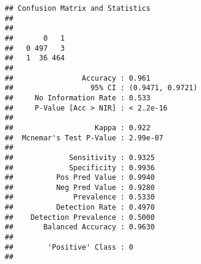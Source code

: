 \documentclass[]{article}
\newenvironment{Shaded}{\begin{snugshade}}{\end{snugshade}}
\newcommand{\KeywordTok}[1]{\textcolor[rgb]{0.13,0.29,0.53}{\textbf{#1}}}
\newcommand{\DataTypeTok}[1]{\textcolor[rgb]{0.13,0.29,0.53}{#1}}
\newcommand{\DecValTok}[1]{\textcolor[rgb]{0.00,0.00,0.81}{#1}}
\newcommand{\FloatTok}[1]{\textcolor[rgb]{0.00,0.00,0.81}{#1}}
\newcommand{\StringTok}[1]{\textcolor[rgb]{0.31,0.60,0.02}{#1}}
\newcommand{\OperatorTok}[1]{\textcolor[rgb]{0.81,0.36,0.00}{\textbf{#1}}}
\newcommand{\NormalTok}[1]{#1}
\begin{document}
\begin{Shaded}
\end{Shaded}

\begin{verbatim}
## Confusion Matrix and Statistics
## 
##    
##       0   1
##   0 497   3
##   1  36 464
##                                           
##                Accuracy : 0.961           
##                  95% CI : (0.9471, 0.9721)
##     No Information Rate : 0.533           
##     P-Value [Acc > NIR] : < 2.2e-16       
##                                           
##                   Kappa : 0.922           
##  Mcnemar's Test P-Value : 2.99e-07        
##                                           
##             Sensitivity : 0.9325          
##             Specificity : 0.9936          
##          Pos Pred Value : 0.9940          
##          Neg Pred Value : 0.9280          
##              Prevalence : 0.5330          
##          Detection Rate : 0.4970          
##    Detection Prevalence : 0.5000          
##       Balanced Accuracy : 0.9630          
##                                           
##        'Positive' Class : 0               
## 
\end{verbatim}
\end{document}
